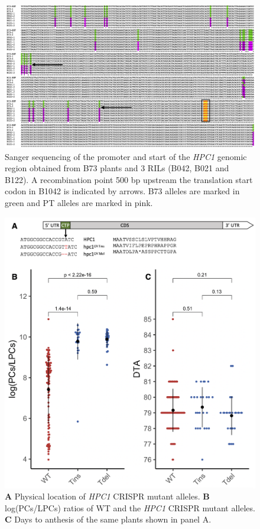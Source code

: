 \documentclass[9pt,twocolumn,twoside,lineno]{biorxiv}
\newcommand{\hpc}{\textit{HPC1}\xspace}
\begin{document}
\begin{figure}[t]
\begin{center}
\includegraphics[width=0.8\paperwidth]{Sup_Figures/Sup_Fig_6.png}
\caption{Sanger sequencing of the promoter and start of the \hpc genomic region obtained from B73 plants and 3 RILs (B042, B021 and B122). A recombination point 500 bp upstream the translation start codon in B1042 is indicated by arrows. B73 alleles are marked in green and PT alleles are marked in pink. 
}
\label{figure:Sup:hpc1_promoter}
\end{center}
\end{figure} 


\clearpage

\begin{figure}[t]
\begin{center}
\includegraphics[width=0.6\paperwidth]{Sup_Figures/Sup_Fig_7.png}
\caption{\textbf{A} Physical location of \hpc CRISPR mutant alleles. \textbf{B} log(PCs/LPCs) ratios of WT and the \hpc CRISPR mutant alleles. \textbf{C} Days to anthesis of the same plants shown in panel A.   
}
\label{figure:Sup:CRISPR_effect}
\end{center}
\end{figure} 
\end{document}
